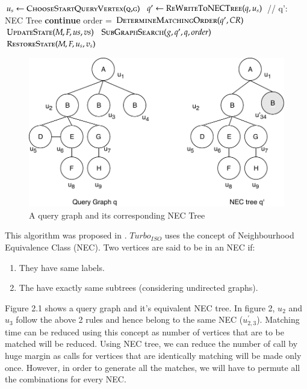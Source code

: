\begin{algorithm}
\caption{\textsc{$Turbo_{ISO}(g,q)$}}\label{euclid}
\begin{algorithmic}[1]
\State $u_s \gets \textsc{ChooseStartQueryVertex(q,g)}$
\State $q' \gets \textsc{ReWriteToNECTree}(q,u_s)$ // q': NEC Tree
        \State \textbf{continue}
    \EndIf
    \State order = $\textsc{DetermineMatchingOrder}(q',CR)$
    \State $\textsc{UpdateState}(M,F,{us},{vs})$
    \State $\textsc{SubGraphSearch}(g,q',q,order)$
    \State $\textsc{RestoreState}(M,F,{u_s},{v_s})$
\EndFor
\end{algorithmic}
\end{algorithm}

\begin{figure}[H]
\centering 
\includegraphics[width=\textwidth]{images/nec.pdf} 
\caption[Query graph and NEC Tree]{A query graph and its corresponding NEC Tree} %
\label{fig:gallery} 
\end{figure}


This algorithm was proposed in \cite{turbo}. $Turbo_{ISO}$ uses the concept of Neighbourhood Equivalence Class (NEC). Two vertices are said to be in an NEC if:
\begin{enumerate}
    \item They have same labels.
    \item The have exactly same subtrees (considering undirected graphs).
\end{enumerate}
Figure 2.1 shows a query graph and it's equivalent NEC tree.
In figure 2, $u_2$ and $u_3$ follow the above 2 rules and hence belong to the same NEC ($u^{'}_{2,3}$).
Matching time can be reduced using this concept as number of vertices that are to be matched will be reduced. Using NEC tree, we can reduce the number of call by huge margin as calls for vertices that are identically matching will be made only once. However, in order to generate all the matches, we will have to permute all the combinations for every NEC.
